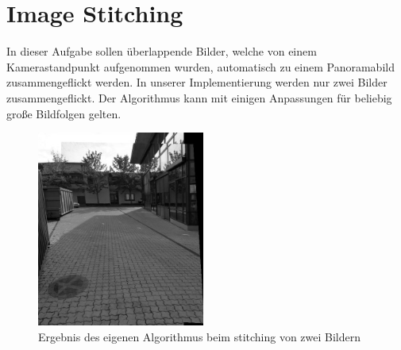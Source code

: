 \newcommand\todo[1]{
\newline
\textcolor{red}{#1}
}

\section{Image Stitching}
\label{sec:ImageStitching}
In dieser Aufgabe sollen überlappende Bilder, welche von einem Kamerastandpunkt aufgenommen wurden, automatisch zu einem Panoramabild zusammengeflickt werden. In unserer Implementierung werden nur zwei Bilder zusammengeflickt. Der Algorithmus kann mit einigen Anpassungen für beliebig große Bildfolgen gelten.

\begin{figure}[ht]
    \centering
    \includegraphics[width=0.49\textwidth]{FiguresIS/ergebnis.jpg}
    \caption{Ergebnis des eigenen Algorithmus beim stitching von zwei Bildern}
\end{figure}

